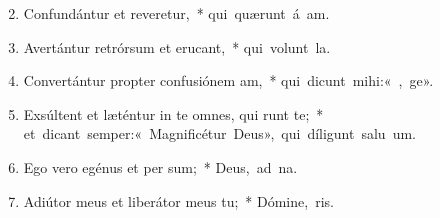 \begin{flushleft}
\begin{enumerate}[leftmargin=*]
\setcounter{enumi}{1}


\item Confundántur et reveretur,~* \mbox{qui quærunt á am.}

\item Avertántur retrórsum et erucant,~* \mbox{qui volunt  la.}

\item Convertántur propter confusiónem am,~* \mbox{qui dicunt mihi:« , ge».}

\item Exsúltent et læténtur in te omnes, qui runt te;~* \mbox{et dicant semper:« Magnificétur Deus», qui díligunt salu um.}

\item Ego vero egénus et per sum;~* \mbox{Deus, ad  na.}

\item Adiútor meus et liberátor meus  tu;~* \mbox{Dómine,  ris.}

\end{enumerate}
\end{flushleft}

